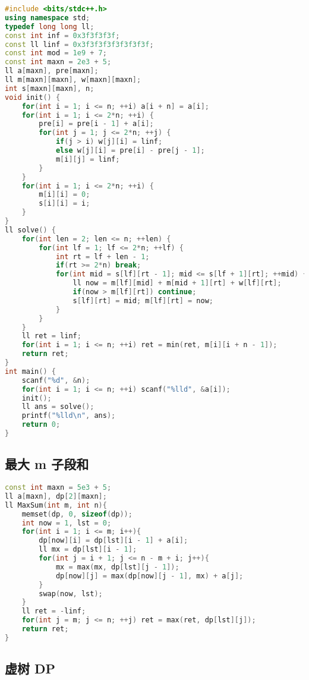 \begin{lstlisting}[language=C++]
#include <bits/stdc++.h>
using namespace std;
typedef long long ll;
const int inf = 0x3f3f3f3f;
const ll linf = 0x3f3f3f3f3f3f3f3f;
const int mod = 1e9 + 7;
const int maxn = 2e3 + 5;
ll a[maxn], pre[maxn];
ll m[maxn][maxn], w[maxn][maxn];
int s[maxn][maxn], n;
void init() {
    for(int i = 1; i <= n; ++i) a[i + n] = a[i];
    for(int i = 1; i <= 2*n; ++i) {
        pre[i] = pre[i - 1] + a[i];
        for(int j = 1; j <= 2*n; ++j) {
            if(j > i) w[j][i] = linf;
            else w[j][i] = pre[i] - pre[j - 1];
            m[i][j] = linf;
        }
    }
    for(int i = 1; i <= 2*n; ++i) {
        m[i][i] = 0;
        s[i][i] = i;
    }
}
ll solve() {
    for(int len = 2; len <= n; ++len) {
        for(int lf = 1; lf <= 2*n; ++lf) {
            int rt = lf + len - 1;
            if(rt >= 2*n) break;
            for(int mid = s[lf][rt - 1]; mid <= s[lf + 1][rt]; ++mid) {
                ll now = m[lf][mid] + m[mid + 1][rt] + w[lf][rt];
                if(now > m[lf][rt]) continue;
                s[lf][rt] = mid; m[lf][rt] = now;
            }
        }
    }
    ll ret = linf;
    for(int i = 1; i <= n; ++i) ret = min(ret, m[i][i + n - 1]);
    return ret;
}
int main() {
    scanf("%d", &n);
    for(int i = 1; i <= n; ++i) scanf("%lld", &a[i]);
    init();
    ll ans = solve();
    printf("%lld\n", ans);
    return 0;
}
\end{lstlisting}

\subsection{最大 m 子段和}

\begin{lstlisting}[language=C++]
const int maxn = 5e3 + 5;
ll a[maxn], dp[2][maxn];
ll MaxSum(int m, int n){
    memset(dp, 0, sizeof(dp));
    int now = 1, lst = 0;
    for(int i = 1; i <= m; i++){
        dp[now][i] = dp[lst][i - 1] + a[i];
        ll mx = dp[lst][i - 1];
        for(int j = i + 1; j <= n - m + i; j++){
            mx = max(mx, dp[lst][j - 1]);
            dp[now][j] = max(dp[now][j - 1], mx) + a[j];
        }
        swap(now, lst);
    }
    ll ret = -linf;
    for(int j = m; j <= n; ++j) ret = max(ret, dp[lst][j]);
    return ret;
}
\end{lstlisting}


\subsection{虚树 DP}

